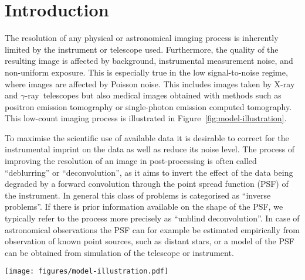 \documentclass[twocolumn, lineno]{aastex631}
\newcommand{\gammaray}{$\gamma$-ray\xspace}
\newcommand{\xray}{X-ray\xspace}
\begin{document}
    \section{Introduction}
    The resolution of any physical or astronomical imaging process is inherently limited by the instrument or telescope used. Furthermore, the quality of the resulting image is affected by background, instrumental measurement noise, and non-uniform exposure. This is especially true in the low signal-to-noise regime, where images are affected by Poisson noise. This includes images taken by \xray and \gammaray~telescopes but also medical images obtained with methods such as positron emission tomography or single-photon emission computed tomography. This low-count imaging process is illustrated in Figure~\ref{fig:model-illustration}.

    To maximise the scientific use of available data it is desirable to correct for the instrumental imprint on the data as well as reduce its noise level. The process of improving the resolution of an image in post-processing is often called \enquote{deblurring} or \enquote{deconvolution}, as it aims to invert the effect of the data being degraded by a forward convolution through the point spread function (PSF) of the instrument. In general this class of problems is categorised as \enquote{inverse problems}. If there is prior information available on the shape of the PSF, we typically refer to the process more precisely as \enquote{unblind deconvolution}. In case of astronomical observations the PSF can for example be estimated empirically from observation of known point sources, such as distant stars, or a model of the PSF can be obtained from simulation of the telescope or instrument.

    \begin{figure*}
        \begin{centering}
            \texttt{[image: figures/model-illustration.pdf]}
            \caption{
                Illustration of the forward model of the low-count imaging process. The flux represents the true unknown flux distribution in the sky. The flux is convolved with an image of the PSF, which represents an estimate of the resolution of the imaging instrument. The exposure consists of the superposition of multiple independent observations with different observation time and pointing position. The exposure weighted flux image is degraded by Poisson noise.
            }
            \label{fig:model-illustration}
        \end{centering}
    \end{figure*}
    
\end{document}
